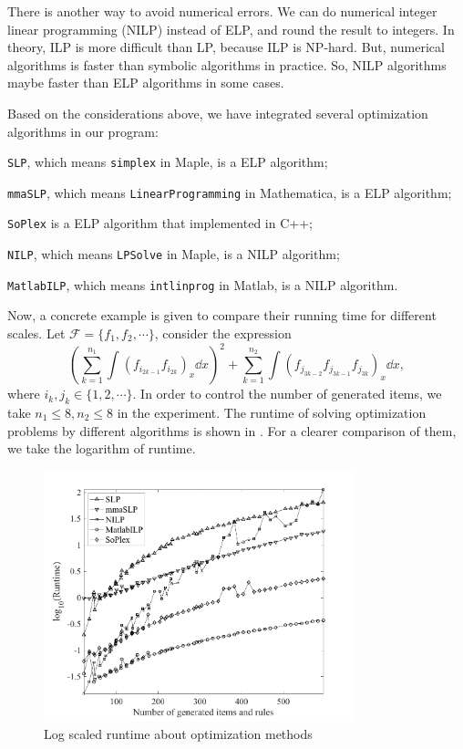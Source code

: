 There is another way to avoid numerical errors. We can do numerical integer linear programming (NILP) instead of ELP, and round the result to integers. In theory, ILP is more difficult than LP, because ILP is NP-hard. But, numerical algorithms is faster than symbolic algorithms in practice. So, NILP algorithms maybe faster than ELP algorithms in some cases.

Based on the considerations above, we have integrated several optimization algorithms in our program:
\begin{compactitem}[\textbullet]
\item \texttt{SLP}, which means \texttt{simplex} in Maple, is a ELP algorithm; 
\item \texttt{mmaSLP}, which means \texttt{LinearProgramming} in Mathematica, is a ELP algorithm;
\item \texttt{SoPlex} \citep{soplex} is a ELP algorithm that implemented in C++;
\item \texttt{NILP}, which means \texttt{LPSolve} in Maple, is a NILP algorithm;
\item \texttt{MatlabILP}, which means \texttt{intlinprog} in Matlab, is a NILP algorithm.
\end{compactitem}

Now, a concrete example is given to compare their running time for different scales. Let $\mathcal F=\{f_1,f_2,\cdots\}$, consider the expression
\begin{equation}
\left(\sum\limits_{k=1}^{n_1}{\int\!{(f_{i_{2k-1}}f_{i_{2k}})_x\dd x}}\right)^2+\sum\limits_{k=1}^{n_2}{\int\!{(f_{j_{3k-2}}f_{j_{3k-1}}f_{j_{3k}})_x\dd x}},
\end{equation}
where $i_k,j_k \in \{1,2,\cdots\}$. In order to control the number of generated items, we take $n_1\le 8,n_2\le 8$ in the experiment. The runtime of solving optimization problems by different algorithms is shown in . For a clearer comparison of them, we take the logarithm of runtime.

\begin{figure}[htb]
\centering
\includegraphics[width=0.8\textwidth]{fig/int-6.pdf}
\caption{Log scaled runtime about optimization methods}\label{opts_log}
\label{opts_all}
\end{figure}

